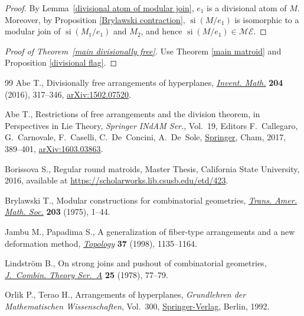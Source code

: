 \documentclass[11pt]{article}
\DeclareMathOperator{\si}{si}
\begin{document}
\begin{proof}
By Lemma~\ref{divisional atom of modular join}, $ e_{1} $ is a divisional atom of $ M $.
Moreover, by Proposition \ref{Brylawski contraction}, $ \si(M/e_{1}) $ is isomorphic to a modular join of $ \si(M_{1}/e_{1}) $ and $ M_{2} $, and hence $ \si(M/e_{1}) \in \mathcal{ME} $.
\end{proof}

\begin{proof}[Proof of Theorem~\ref{main divisionally free}] Use Theorem \ref{main matroid} and Proposition \ref{divisional flag}.
\end{proof}
\begin{thebibliography}{99}
Abe T., Divisionally free arrangements of hyperplanes, \href{https://doi.org/10.1007/s00222-015-0615-7}{\textit{Invent. Math.}}
 \textbf{204} (2016), 317--346, \href{https://arxiv.org/abs/1502.07520}{arXiv:1502.07520}.

Abe T., Restrictions of free arrangements and the division theorem, in
 Perspectives in {L}ie Theory, \textit{Springer INdAM Ser.}, Vol.~19, Editors
 F.~Callegaro, G.~Carnovale, F.~Caselli, C.~De~Concini, A.~De~Sole, \href{https://doi.org/10.1007/978-3-319-58971-8_14}{Springer},
 Cham, 2017, 389--401, \href{https://arxiv.org/abs/1603.03863}{arXiv:1603.03863}.

Borissova S., Regular round matroids, {M}aster Thesis, California State
 University, 2016, available at
 \url{https://scholarworks.lib.csusb.edu/etd/423}.

Brylawski T., Modular constructions for combinatorial geometries,
 \href{https://doi.org/10.2307/1997065}{\textit{Trans. Amer. Math. Soc.}} \textbf{203} (1975), 1--44.

Jambu M., Papadima S., A generalization of fiber-type arrangements and a new
 deformation method, \href{https://doi.org/10.1016/S0040-9383(97)00092-X}{\textit{Topology}} \textbf{37} (1998), 1135--1164.

Lindstr\"om B., On strong joins and pushout of combinatorial geometries,
 \href{https://doi.org/10.1016/0097-3165(78)90035-3}{\textit{J.~Combin. Theory Ser.~A}} \textbf{25} (1978), 77--79.

Orlik P., Terao H., Arrangements of hyperplanes, \textit{Grundlehren der
 Mathematischen Wissenschaften}, Vol.~300, \href{https://doi.org/10.1007/978-3-662-02772-1}{Springer-Verlag}, Berlin, 1992.


\end{thebibliography}
\end{document}
